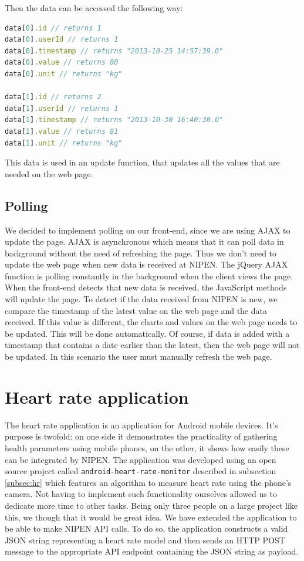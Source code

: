 Then the data can be accessed the following way:
\begin{lstlisting}[language=JavaScript]
data[0].id // returns 1
data[0].userId // returns 1
data[0].timestamp // returns "2013-10-25 14:57:39.0"
data[0].value // returns 80
data[0].unit // returns "kg"

data[1].id // returns 2
data[1].userId // returns 1
data[1].timestamp // returns "2013-10-30 16:40:30.0"
data[1].value // returns 81
data[1].unit // returns "kg"
\end{lstlisting}

This data is used in an update function, that updates all the values that are needed on the web page.

\subsection{Polling}

We decided to implement polling on our front-end, since we are using AJAX to update the page.
AJAX is asynchronous which means that it can poll data in background without the need of refreshing the page.
Thus we don't need to update the web page when new data is received at NIPEN.
The jQuery AJAX function is polling constantly in the background when the client views the page.
When the front-end detects that new data is received, the JavaScript methods will update the page.
To detect if the data received from NIPEN is new, we compare the timestamp of the latest value on the web page and the data received.
If this value is different, the charts and values on the web page needs to be updated.
This will be done automatically.
Of course, if data is added with a timestamp that contains a date earlier than the latest, then the web page 
will not be updated.
In this scenario the user must manually refresh the web page.

\section{Heart rate application}

The heart rate application is an application for Android mobile devices.
It's purpose is twofold: on one side it demonstrates the practicality of gathering health parameters using mobile phones,
on the other, it shows how easily these can be integrated by NIPEN. %
The application was developed using an open source project called \verb|android-heart-rate-monitor| described
in subsection \ref{subsec:hr} which features an algorithm to measure heart rate using the phone's camera.
Not having to implement such functionality ourselves allowed us to dedicate more time to other tasks.
Being only three people on a large project like this, we though that it would be great idea.
We have extended the application to be able to make NIPEN API calls.
To do so, the application constructs a valid JSON string representing a heart rate model and then
sends an HTTP POST message to the appropriate API endpoint containing the JSON string as payload.

